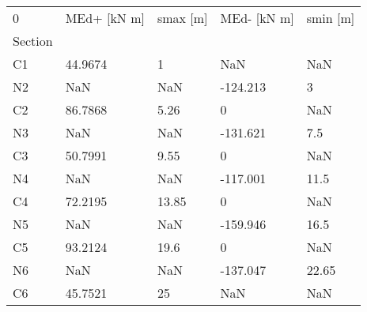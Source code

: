 \begin{tabular}{lllll}
\toprule
0 & MEd+ [kN m] & smax [m] & MEd- [kN m] & smin [m] \\
Section &             &          &             &          \\
\midrule
C1      &     44.9674 &        1 &         NaN &      NaN \\
N2      &         NaN &      NaN &    -124.213 &        3 \\
C2      &     86.7868 &     5.26 &           0 &      NaN \\
N3      &         NaN &      NaN &    -131.621 &      7.5 \\
C3      &     50.7991 &     9.55 &           0 &      NaN \\
N4      &         NaN &      NaN &    -117.001 &     11.5 \\
C4      &     72.2195 &    13.85 &           0 &      NaN \\
N5      &         NaN &      NaN &    -159.946 &     16.5 \\
C5      &     93.2124 &     19.6 &           0 &      NaN \\
N6      &         NaN &      NaN &    -137.047 &    22.65 \\
C6      &     45.7521 &       25 &         NaN &      NaN \\
\bottomrule
\end{tabular}
